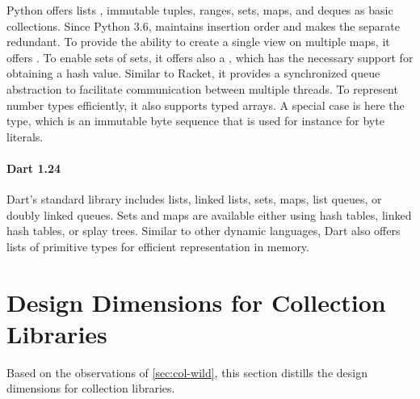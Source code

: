 \documentclass[sigconf, 10pt]{acmart}
\begin{document}
Python offers lists , immutable tuples, ranges, sets, maps, and deques
as basic collections.
Since Python 3.6,  maintains insertion order and
makes the separate  redundant.
To provide the ability to create a single view on multiple maps,
it offers .
To enable sets of sets, it offers also a ,
which has the necessary support for obtaining a hash value.
Similar to Racket,
it provides a synchronized queue abstraction
to facilitate communication between multiple threads.
To represent number types efficiently, it also supports typed arrays.
A special case is here the  type,
which is an immutable byte sequence that is used for instance for byte literals.

\paragraph{Dart 1.24}

Dart's standard library includes lists, linked lists, sets, maps, list queues,
or doubly linked queues.
Sets and maps are available either using hash tables,
linked hash tables, or splay trees.
Similar to other dynamic languages,
Dart also offers lists of primitive types
for efficient representation in memory.



\section{Design Dimensions for Collection Libraries}
\label{sec:dimensions}

Based on the observations of \cref{sec:col-wild},
this section distills the design dimensions for collection libraries. 
\end{document}

